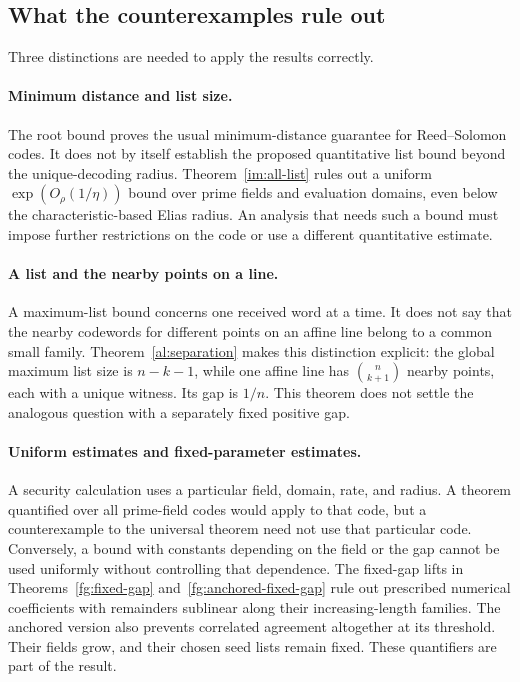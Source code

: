 \documentclass[11pt,letterpaper]{article}
\theoremstyle{definition}
\theoremstyle{remark}
\begin{document}
\subsection{What the counterexamples rule out}

Three distinctions are needed to apply the results correctly.

\paragraph{Minimum distance and list size.}
The root bound proves the usual minimum-distance guarantee for
Reed--Solomon codes. It does not by itself establish the proposed quantitative list bound
beyond the unique-decoding radius.
Theorem~\ref{im:all-list} rules out a uniform
$\exp(O_\rho(1/\eta))$ bound over prime fields and evaluation
domains, even below the characteristic-based Elias radius. An
analysis that needs such a bound must impose further restrictions
on the code or use a different quantitative estimate.

\paragraph{A list and the nearby points on a line.}
A maximum-list bound concerns one received word at a time. It does
not say that the nearby codewords for different points on an affine
line belong to a common small family. Theorem~\ref{al:separation}
makes this distinction explicit: the global maximum list size is
$n-k-1$, while one affine line has $\binom n{k+1}$ nearby points,
each with a unique witness. Its gap is $1/n$. This theorem does not
settle the analogous question with a separately fixed positive gap.

\paragraph{Uniform estimates and fixed-parameter estimates.}
A security calculation uses a particular field, domain, rate, and
radius. A theorem quantified over all prime-field codes would apply
to that code, but a counterexample to the universal theorem need
not use that particular code. Conversely, a bound with constants
depending on the field or the gap cannot be used uniformly without
controlling that dependence. The fixed-gap lifts in
Theorems~\ref{fg:fixed-gap} and~\ref{fg:anchored-fixed-gap} rule out
prescribed numerical coefficients with remainders sublinear along
their increasing-length families. The anchored version also prevents
correlated agreement altogether at its threshold. Their fields grow,
and their chosen seed lists remain fixed.
These quantifiers are part of the result.
\end{document}
